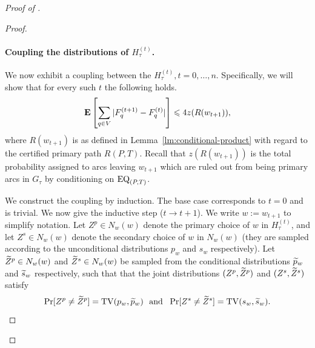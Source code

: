 \begin{proof}[Proof of ]
\begin{proof}
\paragraph{Coupling the distributions of $H_\tau^{(t)}$.} We now exhibit a coupling between the $H_\tau^{(t)},t=0,\ldots, n$. Specifically, we will show that for every such $t$ the following holds.
\begin{equation}\label{eq:9243hg9h9234g}
{\bf E}\left[\sum_{q\in V} |F^{(t+1)}_q-F^{(t)}_q|\right]\leqslant 4z(R(w_{t+1})),
\end{equation}
where $R(w_{t+1})$ is as defined in Lemma~\ref{lm:conditional-product} with regard to the certified primary path $R(P,T)$.
Recall that $z(R(w_{t+1}))$ is the total probability assigned to arcs leaving $w_{t+1}$ which are ruled out from being primary arcs in $G_\tau$ by conditioning on $\mathrm{EQ}_{(P, T)}$.

We construct the coupling by induction. The base case corresponds to $t=0$ and is trivial. We now give the  inductive step ($t\to t+1$). We write $w:=w_{t+1}$ to simplify notation. Let $Z^p\in N_w(w)$ denote the primary choice of $w$ in $H_\tau^{(t)}$, and let $Z^s\in N_w(w)$ denote the secondary choice of $w$ in $N_w(w)$ (they are sampled according to the unconditional distributions $p_w$ and $s_w$ respectively). Let $\widetilde{Z}^p\in N_w(w)$ and $\widetilde{Z}^s\in N_w(w)$ be sampled from the conditional distributions $\widetilde{p}_w$ and $\widetilde{s}_w$ respectively, such that that the joint distributions $(Z^p, \widetilde{Z}^p)$ and $(Z^s, \widetilde{Z}^s)$ satisfy
\begin{equation}\label{eq:923y9th23t32}
\Pr[Z^p\neq \widetilde{Z}^p]=\operatorname{TV}(p_w, \widetilde{p}_w)\text{~~and~~}\Pr[Z^s\neq \widetilde{Z}^s]=\operatorname{TV}(s_w, \widetilde{s}_w).
\end{equation}



\end{proof}
\end{proof}
